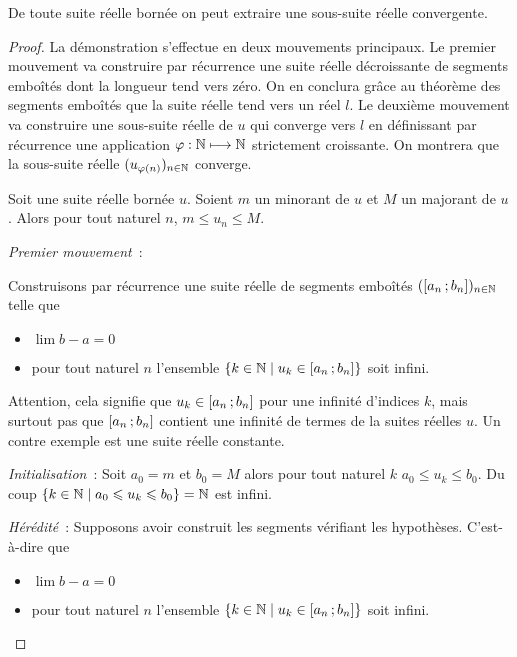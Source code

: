 \begin{theo}
  De toute suite réelle bornée on peut extraire une sous-suite réelle convergente.
\end{theo}
\begin{proof}
 La démonstration s'effectue en deux mouvements principaux. Le premier mouvement va construire par récurrence une suite réelle décroissante de segments emboîtés dont la longueur tend vers zéro. On en conclura grâce au théorème des segments emboîtés que la suite réelle tend vers un réel \(l\). Le deuxième mouvement va construire une sous-suite réelle de \(u\) qui converge vers \(l\) en définissant par récurrence une application \(\varphi : \mathbb{N} \longmapsto \mathbb{N}\) strictement croissante. On montrera que la sous-suite réelle \((u_{\varphi(n)})_{n \in \mathbb{N}}\) converge.

 Soit une suite réelle bornée \(u\). Soient \(m\) un minorant de \(u\) et \(M\) un majorant de \(u\). Alors pour tout naturel \(n\), \(m \leqslant u_n \leqslant M\).

\emph{Premier mouvement}~:

Construisons par récurrence une suite réelle de segments emboîtés \((\left[ a_n \, ;  b_n \right])_{n \in \mathbb{N}}\) telle que
\begin{itemize}
\item \(\lim b-a =0\)
\item pour tout naturel \(n\) l'ensemble \(\left\{k \in \mathbb{N}\mathrel{}\middle|\mathrel{}u_k \in \left[ a_n \, ;  b_n \right]\right\}\) soit infini.
\end{itemize}

Attention, cela signifie que \(u_k \in \left[ a_n \, ;  b_n \right]\) pour une infinité d'indices \(k\), mais surtout pas que \(\left[ a_n \, ;  b_n \right]\) contient une infinité de termes de la suites réelles \(u\). Un contre exemple est une suite réelle constante.

\emph{Initialisation}~: Soit \(a_0=m\) et \(b_0=M\) alors pour tout naturel \(k\) \(a_0 \leqslant u_k \leqslant b_0\). Du coup \(\left\{k \in \mathbb{N}\mathrel{}\middle|\mathrel{}a_0 \leqslant u_k \leqslant b_0\right\}=\mathbb{N}\) est infini.

\emph{Hérédité}~: Supposons avoir construit les segments vérifiant les hypothèses. C'est-à-dire que
\begin{itemize}
\item \(\lim b-a =0\)
\item pour tout naturel \(n\) l'ensemble \(\left\{k \in \mathbb{N}\mathrel{}\middle|\mathrel{}u_k \in \left[ a_n \, ;  b_n \right]\right\}\) soit infini.
\end{itemize}


\end{proof}
